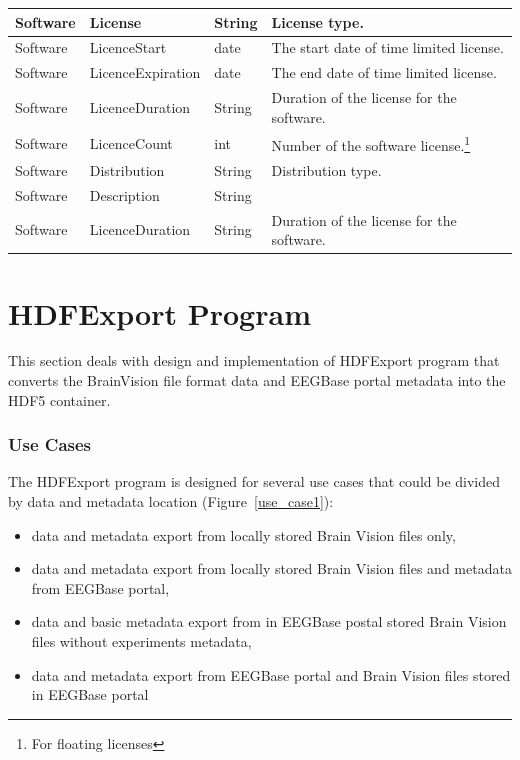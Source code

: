 \documentclass[conference]{IEEEtran}
\begin{document}
\begin{savenotes}
\begin{table}
\begin{tabular}{ | l | l | l | p{3cm} |}
 	\hline
 	Software & License & String & License type.\\
 	\hline
 	Software & LicenceStart & date & The start date of time limited license.\\ 		\hline
 	Software & LicenceExpiration & date & The end date of time limited license.\\ 		\hline
 	Software & LicenceDuration & String & Duration of the license for the software.\\ 		\hline
 	Software & LicenceCount & int & Number of the software license.\footnote{For floating licenses}\\ 		\hline
 	Software & Distribution & String & Distribution type.\\ 		\hline
 	Software & Description & String & \\ 		\hline
 	Software & LicenceDuration & String & Duration of the license for the software.\\ 		\hline
 \end{tabular}

 \end{table}
 \end{savenotes}
 
\section{HDFExport Program}

This section deals with design and implementation of HDFExport program that converts the BrainVision file format data and EEGBase portal metadata into the HDF5 container.

\subsubsection {Use Cases}
The HDFExport program is designed for several use cases that could be divided by data and metadata location (Figure~\ref{use_case1}):
\begin{itemize}
	\item data and metadata export from locally stored Brain Vision files only,
	\item data and metadata export from locally stored Brain Vision files and metadata from EEGBase portal,
	\item data and basic metadata export from in EEGBase postal stored Brain Vision files without experiments metadata,
	\item data and metadata export from EEGBase portal and Brain Vision files stored in EEGBase portal
\end{itemize}
\end{document}
